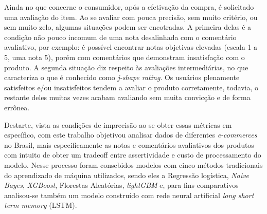 Ainda no que concerne o consumidor, após a efetivação da compra, é solicitado uma avaliação do item. Ao se avaliar com pouca precisão, sem muito critério, ou sem muito zelo, algumas situações podem ser encotradas. A primeira delas é a condição não pouco incomum de uma nota desalinhada com o comentário avaliativo, por exemplo: é possível encontrar notas objetivas elevadas (escala 1 a 5, uma nota 5), porém com comentários que demonstram insatisfação com o produto. A segunda situação diz respeito às avaliações intermediárias, no que caracteriza o que é conhecido como \textit{j-shape rating}. Os usuários plenamente satisfeitos e/ou insatisfeitos tendem a avaliar o produto corretamente, todavia, o restante deles muitas vezes acabam avaliando sem muita convicção e de forma errônea.

Destarte, vista as condições de imprecisão ao se obter essas métricas em específico, com este trabalho objetivou analisar dados de diferentes \textit{e-commerces} no Brasil, mais especificamente as notas e comentários avaliativos dos produtos com intuito de obter um tradeoff entre assertividade e custo de processamento do modelo. Nesse processo foram consebidos modelos com cinco métodos tradicionais do aprendizado de máquina utilizados, sendo eles a Regressão logística, \textit{Naive Bayes}, \textit{XGBoost}, Florestas Aleatórias, \textit{lightGBM} e, para fins comparativos analisou-se também um modelo construído com rede neural artificial \textit{long short term memory} (LSTM).
